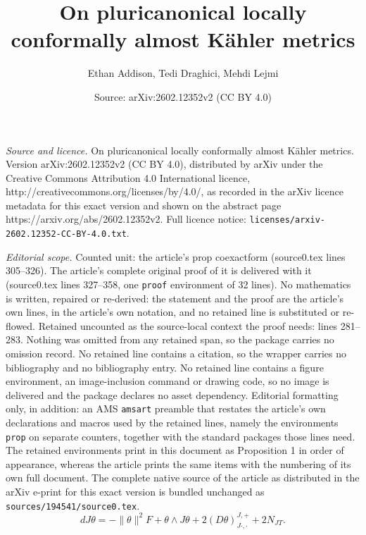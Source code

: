 \documentclass[10pt,a4paper]{amsart}
\title{On pluricanonical locally conformally almost K\"ahler metrics}
\author{Ethan Addison, Tedi Draghici, Mehdi Lejmi}
\date{Source: arXiv:2602.12352v2 (CC BY 4.0)}
\begin{document}
\maketitle

\noindent\emph{Source and licence.} On pluricanonical locally conformally almost K\"ahler metrics. Version arXiv:2602.12352v2 (CC BY 4.0), distributed by arXiv under the Creative Commons Attribution 4.0 International licence, http://creativecommons.org/licenses/by/4.0/, as recorded in the arXiv licence metadata for this exact version and shown on the abstract page https://arxiv.org/abs/2602.12352v2. Full licence notice: \texttt{licenses/arxiv-2602.12352-CC-BY-4.0.txt}.\par\smallskip

\noindent\textit{Editorial scope.} Counted unit: the article's prop coexactform (source0.tex lines 305--326). The article's complete original proof of it is delivered with it (source0.tex lines 327--358, one \texttt{proof} environment of 32 lines). No mathematics is written, repaired or re-derived: the statement and the proof are the article's own lines, in the article's own notation, and no retained line is substituted or re-flowed.  Retained uncounted as the source-local context the proof needs: lines 281--283.  Nothing was omitted from any retained span, so the package carries no omission record.  No retained line contains a citation, so the wrapper carries no bibliography and no bibliography entry.  No retained line contains a figure environment, an image-inclusion command or drawing code, so no image is delivered and the package declares no asset dependency.  Editorial formatting only, in addition: an AMS \texttt{amsart} preamble that restates the article's own declarations and macros used by the retained lines, namely the environments \texttt{prop} on separate counters, together with the standard packages those lines need.  The retained environments print in this document as Proposition 1 in order of appearance, whereas the article prints the same items with the numbering of its own full document.  The complete native source of the article as distributed in the arXiv e-print for this exact version is bundled unchanged as \texttt{sources/194541/source0.tex}.
\begin{equation}\label{dJtheta-formula}
 dJ\theta = -\|\theta\|^2 F + \theta \wedge J\theta+2(D \theta)^{J,+}_{J\cdot,\cdot}  + 2N_{JT}.
 \end{equation}
\end{document}

